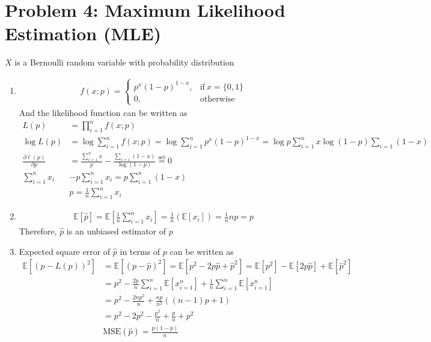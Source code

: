\section{Problem 4: Maximum Likelihood Estimation (MLE)}

	$X$ is a Bernoulli random variable with probability distribution
	\begin{enumerate}
		\item 
			\begin{align*}
				f(x; p) = \begin{cases}
					p^{x} (1 - p)^{1 - x}, & \text{if} \ x = \{ 0, 1 \} \\
					0, & \text{otherwise}
				\end{cases}
			\end{align*}
			And the likelihood function can be written as 
			\begin{align*}
				L(p) & = \prod_{i=1}^{n} f(x; p) \\
				\log L(p) & = \log \sum_{i=1}^{n} f(x; p) = \log \sum_{i=1}^{n} p^{x} (1 - p)^{1 - x} = \log p \sum_{i=1}^{n} x \log (1 - p) \sum_{i=1} (1 - x) \\
				\frac{\partial \ell(p)}{\partial p} & = \frac{\sum_{i=1}^{n} x}{p} - \frac{\sum_{i=1} (1 - x)}{\log (1 - p)} \overset{\text{set}}{=} 0 \\
				\sum_{i=1}^{n} x_{i} & - p\sum_{i=1}^{n} x_{i} = p \sum_{i=1}^{n} (1 - x) \\
				& \boxed{p = \frac{1}{n} \sum_{i=1}^{n} x_{i}}
			\end{align*}
	
		\item
			\begin{align*}
				\mathbb{E}[\hat{p}] = \mathbb{E}[\frac{1}{n} \sum_{i=1}^{n} x_{i}] = \frac{1}{n} \left( \mathbb{E}[x_{i}] \right) =  \frac{1}{n} np = p	
			\end{align*}
			Therefore, $\hat{p}$ is an unbiased estimator of $p$
		
		\item 
			Expected square error of $\hat{p}$ in terms of $p$ can be written as 
			\begin{align*}
				\mathbb{E}[ (p - L(p))^{2} ] & = \mathbb{E}[ (p - \hat{p})^{2} ] = \mathbb{E}[ p^{2} - 2p\hat{p} + \hat{p}^{2} ] = \mathbb{E}[ p^{2} ] - \mathbb{E}[ 2p\hat{p} ] + \mathbb{E}[ \hat{p}^{2} ] \\
				& = p^{2} - \frac{2p}{n} \sum_{i=1}^{n} \mathbb{E}[x_{i=1}^{n}] + \frac{1}{n} \sum_{i=1}^{n} \mathbb{E} [x_{i=1}^{n}] \\
				& = p^{2} - \frac{2np^{2}}{n} + \frac{np}{n^{2}} ((n - 1) p + 1) \\
				& = p^{2} - 2p^{2} - \frac{p^{2}}{n} + \frac{p}{n} + p^{2} \\
				& \boxed{\text{MSE}(\hat{p}) = \frac{p(1 - p)}{n}}
			\end{align*}
		

\end{enumerate}
